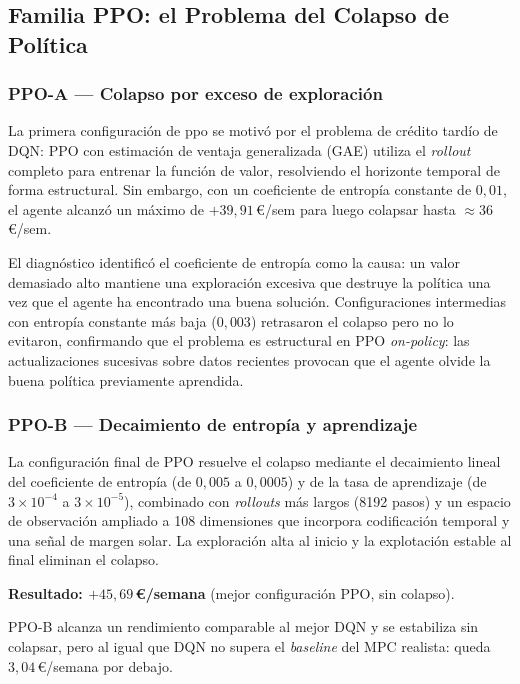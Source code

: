 \documentclass[12pt, a4paper, twoside]{report}
\begin{document}
\subsection{Familia PPO: el Problema del Colapso de Política}

\subsubsection{PPO-A — Colapso por exceso de exploración}

La primera configuración de \acrshort{ppo} se motivó por el problema de crédito
tardío de DQN: PPO con estimación de ventaja generalizada (GAE) utiliza el
\textit{rollout} completo para entrenar la función de valor, resolviendo el
horizonte temporal de forma estructural. Sin embargo, con un coeficiente de
entropía constante de $0{,}01$, el agente alcanzó un máximo de $+39{,}91$\,€/sem
para luego colapsar hasta $\approx$36\,€/sem.

El diagnóstico identificó el coeficiente de entropía como la causa: un valor
demasiado alto mantiene una exploración excesiva que destruye la política una
vez que el agente ha encontrado una buena solución. Configuraciones intermedias
con entropía constante más baja ($0{,}003$) retrasaron el colapso pero no lo
evitaron, confirmando que el problema es estructural en PPO \textit{on-policy}:
las actualizaciones sucesivas sobre datos recientes provocan que el agente
olvide la buena política previamente aprendida.

\subsubsection{PPO-B — Decaimiento de entropía y aprendizaje}

La configuración final de PPO resuelve el colapso mediante el decaimiento
lineal del coeficiente de entropía (de $0{,}005$ a $0{,}0005$) y de la tasa de
aprendizaje (de $3\times10^{-4}$ a $3\times10^{-5}$), combinado con
\textit{rollouts} más largos (8192 pasos) y un espacio de observación ampliado
a 108 dimensiones que incorpora codificación temporal y una señal de margen
solar. La exploración alta al inicio y la explotación estable al final
eliminan el colapso.

\textbf{Resultado: $+45{,}69$\,€/semana} (mejor configuración PPO, sin colapso).

PPO-B alcanza un rendimiento comparable al mejor DQN y se estabiliza sin
colapsar, pero al igual que DQN no supera el \textit{baseline} del MPC realista:
queda $3{,}04$\,€/semana por debajo.
\end{document}
